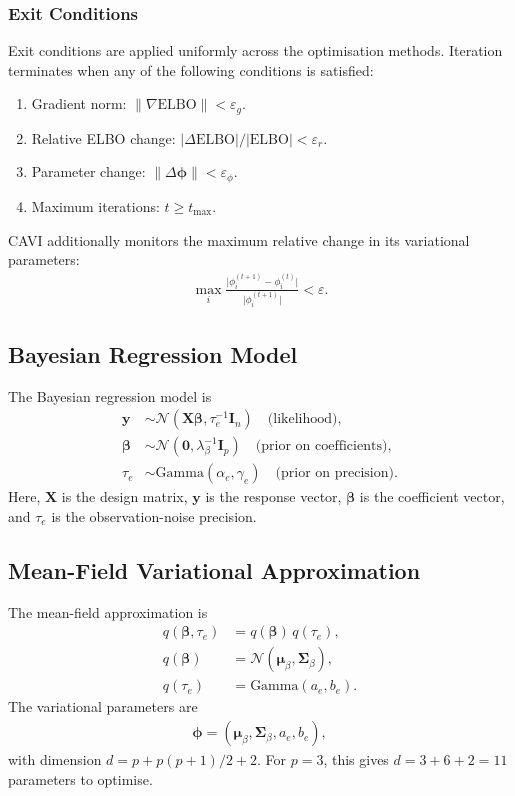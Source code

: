 \documentclass[11pt,a4paper]{article}
\newcommand{\N}{\mathcal{N}}
\newcommand{\ELBO}{\text{ELBO}}
\begin{document}
\subsubsection*{Exit Conditions}

Exit conditions are applied uniformly across the optimisation methods. Iteration terminates when any of the following conditions is satisfied:
\begin{enumerate}[label=(\roman*)]
  \item Gradient norm: $\lVert \nabla \ELBO \rVert < \varepsilon_g$.
  \item Relative ELBO change: $\lvert \Delta \ELBO \rvert / \lvert \ELBO \rvert < \varepsilon_r$.
  \item Parameter change: $\lVert \Delta \bm{\phi} \rVert < \varepsilon_\phi$.
  \item Maximum iterations: $t \geq t_{\max}$.
\end{enumerate}
CAVI additionally monitors the maximum relative change in its variational parameters:
\begin{align}
\max_i \frac{\lvert \phi_i^{(t+1)} - \phi_i^{(t)} \rvert}{\lvert \phi_i^{(t+1)} \rvert} < \varepsilon.
\end{align}

\subsection{Bayesian Regression Model}

The Bayesian regression model is
\begin{align}
\bm{y} &\sim \N(\bm{X}\bm{\beta}, \tau_e^{-1} \bm{I}_n) \quad \text{(likelihood)},\\
\bm{\beta} &\sim \N(\bm{0}, \lambda_\beta^{-1} \bm{I}_p) \quad \text{(prior on coefficients)},\\
\tau_e &\sim \text{Gamma}(\alpha_e, \gamma_e) \quad \text{(prior on precision)}.
\end{align}
Here, $\bm{X}$ is the design matrix, $\bm{y}$ is the response vector, $\bm{\beta}$ is the coefficient vector, and $\tau_e$ is the observation-noise precision.

\subsection{Mean-Field Variational Approximation}

The mean-field approximation is
\begin{align}
q(\bm{\beta}, \tau_e) &= q(\bm{\beta})\,q(\tau_e),\\
q(\bm{\beta}) &= \N(\bm{\mu}_\beta, \bm{\Sigma}_\beta),\\
q(\tau_e) &= \text{Gamma}(a_e, b_e).
\end{align}
The variational parameters are
\begin{align}
\bm{\phi} = (\bm{\mu}_\beta,\bm{\Sigma}_\beta,a_e,b_e),
\end{align}
with dimension $d=p+p(p+1)/2+2$. For $p=3$, this gives $d=3+6+2=11$ parameters to optimise.
\end{document}
